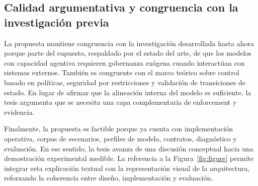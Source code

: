 \subsection{Calidad argumentativa y congruencia con la investigaci\'on previa}
La propuesta mantiene congruencia con la investigaci\'on desarrollada hasta ahora porque parte del supuesto, respaldado por el estado del arte, de que los modelos con capacidad agentiva requieren gobernanza ex\'ogena cuando interact\'uan con sistemas externos. Tambi\'en es congruente con el marco te\'orico sobre control basado en pol\'iticas, seguridad por restricciones y validaci\'on de transiciones de estado. En lugar de afirmar que la alineaci\'on interna del modelo es suficiente, la tesis argumenta que se necesita una capa complementaria de enforcement y evidencia.

Finalmente, la propuesta es factible porque ya cuenta con implementaci\'on operativa, corpus de escenarios, perfiles de modelo, contratos, diagn\'ostico y evaluaci\'on. En ese sentido, la tesis avanza de una discusi\'on conceptual hacia una demostraci\'on experimental medible. La referencia a la Figura~\ref{fig:figure} permite integrar esta explicaci\'on textual con la representaci\'on visual de la arquitectura, reforzando la coherencia entre dise\~no, implementaci\'on y evaluaci\'on.
